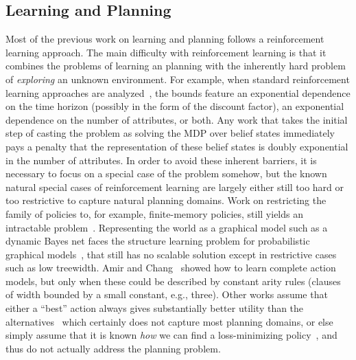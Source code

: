 \documentclass[12pt]{article}
\begin{document}
\subsection{Learning and Planning}
 Most of the previous work on learning and planning follows a reinforcement learning approach. The main difficulty with reinforcement learning is that it combines the problems of learning an planning with the inherently hard problem of {\em exploring} an unknown environment. For example, when standard reinforcement learning approaches are analyzed~\cite{kearns2002POMDPsample,shani2005modelPOMDP}, the bounds feature an exponential dependence on the time horizon (possibly in the form of the discount factor), an exponential dependence on the number of attributes, or both. Any work that takes the initial step of casting the problem as solving the MDP over belief states immediately pays a penalty that the representation of these belief states is doubly exponential in the number of attributes.  In order to avoid these inherent barriers, it is necessary to focus on a special case of the problem somehow, but the known natural special cases of reinforcement learning are largely either still too hard or too restrictive to capture natural planning domains. Work on restricting the family of policies to, for example, finite-memory policies, still yields an intractable problem~\cite{meuleau1999finitestate}. Representing the world as a graphical model such as a dynamic Bayes net faces the structure learning problem for probabilistic graphical models~\cite[Section~19.4]{koller2009pgm}, that still has no scalable solution except in restrictive cases such as low treewidth. 
  Amir and Chang~\cite{amir2008} showed how to learn complete action models, but only when these could be described by constant arity rules (clauses of width bounded by a small constant, e.g., three).
  Other works assume that either a ``best'' action always gives substantially better utility than the alternatives~\cite{fern2006policyIteration} which certainly does not capture most planning domains, or else simply assume that it is known {\em how} we can find a loss-minimizing policy~\cite{lazaric2010policyIteration}, and thus do not actually address the planning problem.
\end{document}
